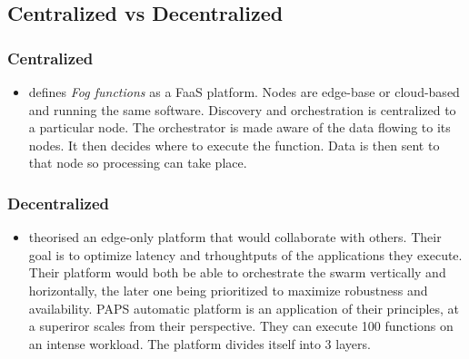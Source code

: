 \documentclass[11pt]{sdm}
\begin{document}
\subsection{Centralized vs Decentralized}
\subsubsection{Centralized}
\begin{itemize}
    \item \citet{cheng_fog_2019} defines \textit{Fog functions} as a \gls{FaaS} platform. Nodes are edge-base or cloud-based and running the same software. Discovery and orchestration is centralized to a particular node. The orchestrator is made aware of the data flowing to its nodes. It then decides where to execute the function. Data is then sent to that node so processing can take place.
\end{itemize}

\subsubsection{Decentralized}
\begin{itemize}
    \item{ \citet{baresi_towards_2019} theorised an edge-only platform that would collaborate with others. Their goal is to optimize latency and trhoughtputs of the applications they execute. Their platform would both be able to orchestrate the swarm vertically and horizontally, the later one being prioritized to maximize robustness and availability.  \gls{PAPS} automatic platform is an application of their principles, at a superiror scales from their perspective. They can execute 100 functions on an intense workload. The platform divides itself into 3 layers.
    }
\end{itemize}
\end{document}
